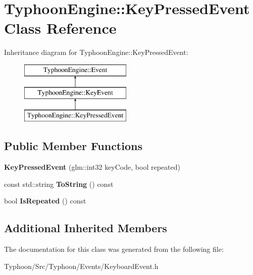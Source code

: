 \hypertarget{class_typhoon_engine_1_1_key_pressed_event}{}\section{Typhoon\+Engine\+::Key\+Pressed\+Event Class Reference}
\label{class_typhoon_engine_1_1_key_pressed_event}
Inheritance diagram for Typhoon\+Engine\+::Key\+Pressed\+Event\+:\begin{figure}[H]
\begin{center}
\leavevmode
\includegraphics[height=3.000000cm]{class_typhoon_engine_1_1_key_pressed_event}
\end{center}
\end{figure}
\subsection*{Public Member Functions}
\begin{DoxyCompactItemize}
\item 
\mbox{\label{class_typhoon_engine_1_1_key_pressed_event_abf5f49bb56905a3dcdf56b1d1e5b553a}} 
{\bfseries Key\+Pressed\+Event} (glm\+::int32 key\+Code, bool repeated)
\item 
\mbox{\label{class_typhoon_engine_1_1_key_pressed_event_ab0b0705a8de76c8d959282de599134d9}} 
const std\+::string {\bfseries To\+String} () const
\item 
\mbox{\label{class_typhoon_engine_1_1_key_pressed_event_a0f4c77b8950f869a0afeb79a07985498}} 
bool {\bfseries Is\+Repeated} () const
\end{DoxyCompactItemize}
\subsection*{Additional Inherited Members}


The documentation for this class was generated from the following file\+:\begin{DoxyCompactItemize}
\item 
Typhoon/\+Src/\+Typhoon/\+Events/Keyboard\+Event.\+h\end{DoxyCompactItemize}
